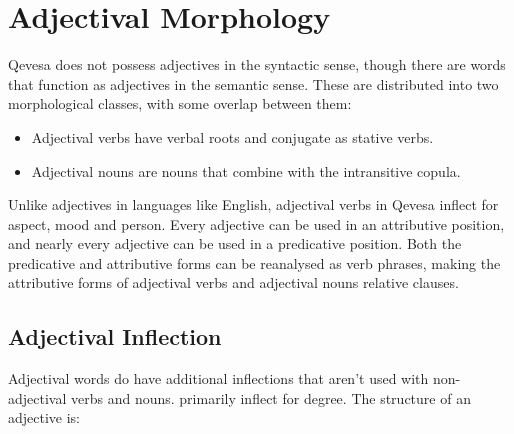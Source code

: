 \documentclass[grammar]{subfiles}
\begin{document}
\chapter{Adjectival Morphology}
\label{ch:adjectival-morphology}

Qevesa does not possess adjectives in the syntactic sense, though there are
words that function as adjectives in the semantic sense.  These are distributed
into two morphological classes, with some overlap between them:

\begin{itemize}
  \item Adjectival verbs have verbal roots and conjugate as stative verbs.
  \item Adjectival nouns are nouns that combine with the intransitive copula.
\end{itemize}

Unlike adjectives in languages like English, adjectival verbs in Qevesa inflect
for aspect, mood and person.  Every adjective can be used in an attributive
position, and nearly every adjective can be used in a predicative position.
Both the predicative and attributive forms can be reanalysed as verb phrases,
making the attributive forms of adjectival verbs and adjectival nouns relative
clauses. 


\section{Adjectival Inflection}
\label{sec:am_adjectival_inflection}

Adjectival words do have additional inflections that aren’t used with non-adjectival verbs and nouns.  primarily inflect for degree.  The structure of an adjective is:
%
%
%
%
%
\end{document}

